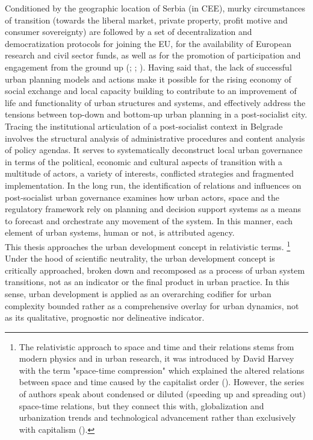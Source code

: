 \documentclass[11pt]{report}
\begin{document}
{{Conditioned by the geographic location of Serbia (in CEE), murky circumstances of transition (towards the liberal market, private property, profit motive and consumer sovereignty) are followed by a set of decentralization and democratization protocols for joining the EU, for the availability of European research and civil sector funds, as well as for the promotion of participation and engagement from the ground up (\citealt{vujosevic_conundrum_2012}; \citealt{vujosevic_regionalizam_2015}; \citealt{zekovic_spatial_2015}).
Having said that, the lack of successful urban planning models and actions make it possible for the rising economy of social exchange and local capacity building to contribute to an improvement of life and functionality of urban structures and systems, and effectively address the tensions between top-down and bottom-up urban planning in a post-socialist city.
\\

Tracing the institutional articulation of a post-socialist context in Belgrade involves the structural analysis of administrative procedures and content analysis of policy agendas. It serves to systematically deconstruct local urban governance in terms of the political, economic and cultural aspects of transition with a multitude of actors, a variety of interests, conflicted strategies and fragmented implementation. In the long run, the identification of relations and influences on post-socialist urban governance examines how urban actors, space and the regulatory framework rely on planning and decision support systems as a means to forecast and orchestrate any movement of the system. In this manner, each element of urban systems, human or not, is attributed agency.
\\

This thesis approaches the urban development concept in relativistic terms.
\footnote{The relativistic approach to space and time and their relations stems from modern physics and in urban research, it was introduced by David Harvey with the term "space-time compression" which explained the altered relations between space and time caused by the capitalist order (\citealt{harvey_condition_2003}). However, the series of authors speak about condensed or diluted (speeding up and spreading out) space-time relations, but they connect this with, globalization and urbanization trends and technological advancement rather than exclusively with capitalism (\href{ref}{\citealt{massey_global_2010}}).}
Under the hood of scientific neutrality, the urban development concept is critically approached, broken down and recomposed as a process of urban system transitions, not as an indicator or the final product in urban practice.
In this sense, urban development is applied as an overarching codifier for urban complexity bounded rather as a comprehensive overlay for urban dynamics, not as its qualitative, prognostic nor delineative indicator.

}}
\end{document}
